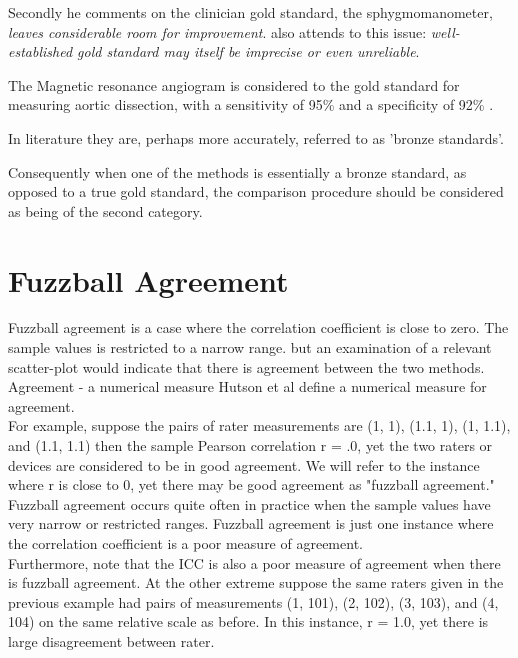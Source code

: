 \documentclass[12pt, a4paper]{report}
\theoremstyle{plain}
\theoremstyle{definition}
\theoremstyle{remark}
\begin{document}
	Secondly he comments on the clinician gold standard, the
	sphygmomanometer, \emph{leaves considerable room for improvement}.
	\citet{pizzi} also attends to this issue: \emph{well-established
		gold standard may itself be imprecise or even unreliable}.
	
	The Magnetic resonance angiogram is considered to the gold
	standard for measuring aortic dissection, with a sensitivity of
	95\% and a specificity of 92\% . \citep{ACR}
	
	In literature they are, perhaps more accurately, referred to as 'bronze standards'.
	
	Consequently when one of the methods is essentially a bronze
	standard, as opposed to a true gold standard, the comparison
	procedure should be considered as being of the second category.
	
\newpage	\section{Fuzzball Agreement}
	Fuzzball agreement is a case where the correlation coefficient is close to zero. The sample values is restricted to a narrow range. but an examination of a relevant scatter-plot would indicate that
	there is agreement between the two methods.
	\\
	Agreement - a numerical measure Hutson et al define a numerical measure for agreement.
	\\
	For example, suppose the pairs of rater measurements are (1, 1), (1.1, 1), (1, 1.1), and (1.1, 1.1) then the sample Pearson correlation r = .0, yet the two raters or devices are considered to be in good agreement. We will refer to the instance where r is close to 0, yet there may be good agreement as "fuzzball agreement." \\Fuzzball agreement occurs quite often in practice when the sample values have very narrow or restricted ranges. Fuzzball agreement is just one instance where the correlation coefficient is a poor measure of agreement. \\Furthermore, note that the ICC is also a poor measure of agreement when there is fuzzball agreement. At the other extreme suppose the same raters given in the previous example had pairs of measurements (1, 101), (2, 102), (3, 103), and (4, 104) on the same relative scale as before. In this instance, r = 1.0, yet there is large disagreement between rater.
	

	\bigskip
\end{document}
